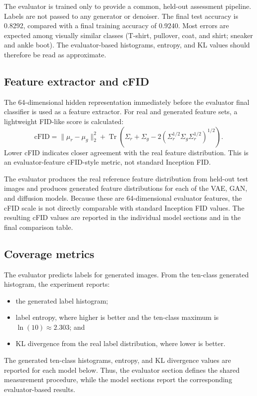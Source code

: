 \documentclass[11pt]{article}
\begin{document}
The evaluator is trained only to provide a common, held-out assessment pipeline. Labels are not passed to any generator or denoiser. The final test accuracy is 0.8292, compared with a final training accuracy of 0.9240. Most errors are expected among visually similar classes (T-shirt, pullover, coat, and shirt; sneaker and ankle boot). The evaluator-based histograms, entropy, and KL values should therefore be read as approximate.

\subsection{Feature extractor and cFID}

The 64-dimensional hidden representation immediately before the evaluator final classifier is used as a feature extractor. For real and generated feature sets, a lightweight FID-like score is calculated:
\[
\mathrm{cFID}=\|\mu_r-\mu_g\|_2^2+
\operatorname{Tr}\left(\Sigma_r+\Sigma_g-
2\left(\Sigma_r^{1/2}\Sigma_g\Sigma_r^{1/2}\right)^{1/2}\right).
\]
Lower cFID indicates closer agreement with the real feature distribution. This is an evaluator-feature cFID-style metric, not standard Inception FID.

The evaluator produces the real reference feature distribution from held-out test images and produces generated feature distributions for each of the VAE, GAN, and diffusion models. Because these are 64-dimensional evaluator features, the cFID scale is not directly comparable with standard Inception FID values. The resulting cFID values are reported in the individual model sections and in the final comparison table.

\subsection{Coverage metrics}

The evaluator predicts labels for generated images. From the ten-class generated histogram, the experiment reports:
\begin{itemize}
\item the generated label histogram;
\item label entropy, where higher is better and the ten-class maximum is $\ln(10)\approx2.303$; and
\item KL divergence from the real label distribution, where lower is better.
\end{itemize}

The generated ten-class histograms, entropy, and KL divergence values are reported for each model below. Thus, the evaluator section defines the shared measurement procedure, while the model sections report the corresponding evaluator-based results.
\end{document}
